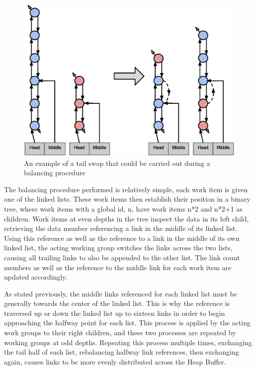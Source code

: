 \documentclass[onecolumn, draftclsnofoot,10pt, compsoc]{IEEEtran}
\begin{document}
\begin{figure}[H]
\begin{center}
\includegraphics[width=\textwidth]{images/TailSwap.eps}
\caption{An example of a tail swap that could be carried out during a balancing procedure}
\end{center}
\end{figure}



The balancing procedure performed is relatively simple, each work item is given one of the linked lists. These work items then establish their position in a binary tree, where work items with a global id, n, have work items n*2 and n*2+1 as children. Work items at even depths in the tree inspect the data in its left child, retrieving the data member referencing a link in the middle of its linked list. Using this reference as well as the reference to a link in the middle of its own linked list, the acting working group switches the links across the two lists, causing all trailing links to also be appended to the other list. The link count members as well as the reference to the middle link for each work item are updated accordingly.

As stated previously, the middle links referenced for each linked list must be generally towards the center of the linked list. This is why the reference is traversed up or down the linked list up to sixteen links in order to begin approaching the halfway point for each list. This process is applied by the acting work groups to their right children, and these two processes are repeated by working groups at odd depths. Repeating this process multiple times, exchanging the tail half of each list, rebalancing halfway link references, then exchanging again, causes links to be more evenly distributed across the Heap Buffer.
\end{document}
